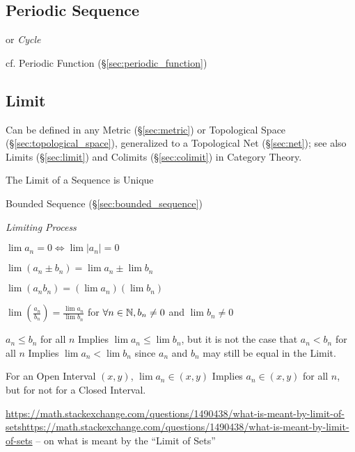 \subsection{Periodic Sequence}\label{sec:periodic_sequence}

or \emph{Cycle}

\fist cf. Periodic Function (\S\ref{sec:periodic_function})



\subsection{Limit}\label{sec:sequence_limit}

Can be defined in any Metric (\S\ref{sec:metric}) or Topological Space
(\S\ref{sec:topological_space}), generalized to a Topological Net
(\S\ref{sec:net}); see also Limits (\S\ref{sec:limit}) and Colimits
(\S\ref{sec:colimit}) in Category Theory.

The Limit of a Sequence is Unique

Bounded Sequence (\S\ref{sec:bounded_sequence})

\emph{Limiting Process}

$\lim a_n = 0 \Leftrightarrow \lim |a_n| = 0$

$\lim (a_n \pm b_n) = \lim a_n \pm \lim b_n$

$\lim (a_n b_n) = (\lim a_n) (\lim b_n)$

$\lim (\frac{a_n}{b_n}) = \frac{\lim a_n}{\lim b_n}$ for $\forall
n \in \mathbb{N}, b_n \neq 0$ and $\lim b_n \neq 0$

$a_n \leq b_n$ for all $n$ Implies $\lim a_n \leq \lim b_n$, but it is
not the case that $a_n < b_n$ for all $n$ Implies $\lim a_n < \lim
b_n$ since $a_n$ and $b_n$ may still be equal in the Limit.

For an Open Interval $(x,y)$, $\lim a_n \in (x,y)$ Implies $a_n \in
(x,y)$ for all $n$, but for not for a Closed Interval.

\url{https://math.stackexchange.com/questions/1490438/what-is-meant-by-limit-of-setshttps://math.stackexchange.com/questions/1490438/what-is-meant-by-limit-of-sets}
-- on what is meant by the ``Limit of Sets''



